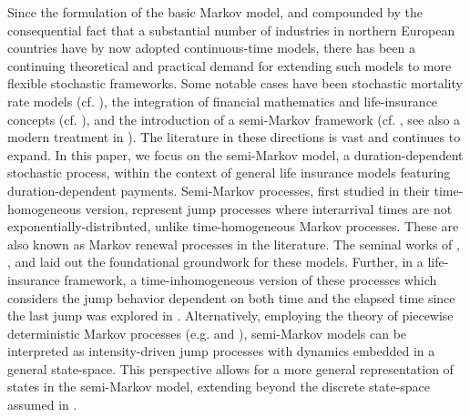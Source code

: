 \documentclass[11pt,leqno]{amsart}
\numberwithin{table}{section}
\numberwithin{figure}{section}
\numberwithin{equation}{section}
\newcommand{\1}{{\mathds{1}}}
\newcommand{\0}{\mat{0}}
\begin{document}
Since the formulation of the basic Markov model, and compounded by the consequential fact that a substantial number of industries in northern European countries have by now adopted continuous-time models, there has been a continuing theoretical and practical demand for extending such models to more flexible stochastic frameworks. Some notable cases have been stochastic mortality rate models (cf. \cite{cairns2008modelling}), the integration of financial mathematics and life-insurance concepts (cf. \cite{steffensen2006surplus}), and the introduction of a semi-Markov framework (cf. \cite{hoem1972inhomogeneous}, see also a modern treatment in \cite{buchardt2015cash}). The literature in these directions is vast and continues to expand. 
{ %
}
In this paper, we focus on the semi-Markov model, a duration-dependent stochastic process, within the context of general life insurance models featuring duration-dependent payments. Semi-Markov processes, first studied in their time-homogeneous version, represent jump processes where interarrival times are not exponentially-distributed, unlike time-homogeneous Markov processes. These are also known as Markov renewal processes in the literature. The seminal works of \cite{levy1954processus}, \cite{smith1955regenerative}, and \cite{cinlar1969markov} laid out the foundational groundwork for these models. Further, in a life-insurance framework, a time-inhomogeneous version of these processes which considers the jump behavior dependent on both time and the elapsed time since the last jump was explored in \cite{hoem1972inhomogeneous,janssen1984finite}. { Alternatively, employing the theory of piecewise deterministic Markov processes (e.g. \cite[Chapter 2]{davis2018markov} and \cite[Chapter 7]{jacobsen2006point}), semi-Markov models can be interpreted as intensity-driven jump processes with dynamics embedded in a general state-space. This perspective allows for a more general representation of states in the semi-Markov model, extending beyond the discrete state-space assumed in \cite{hoem1972inhomogeneous, janssen1984finite}.} 
\end{document}
